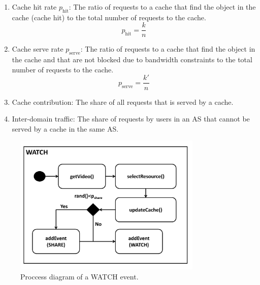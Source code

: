 \begin{enumerate}
\item Cache hit rate $p_\text{hit}$: The ratio of requests to a cache that find the object in the cache (cache hit) to the total number of requests to the cache.
\begin{equation}
  p_\text{hit}=\frac{k}{n}
\end{equation}
\item Cache serve rate $p_\text{serve}$: The ratio of requests to a cache that find the object in the cache and that are not blocked due to bandwidth constraints to the total number of requests to the cache.
\begin{equation}
  p_\text{serve}=\frac{k'}{n}
\end{equation}
\item Cache contribution: The share of all requests that is served by a cache.
\item Inter-domain traffic: The share of requests by users in an AS that cannot be served by a cache in the same AS.
\end{enumerate}

\begin{figure}[bt]
  \centering
  \includegraphics[width=0.8\textwidth]{hierarchical/simulative/figures/watch}
  \caption{Proccess diagram of a WATCH event.}
  \label{fig:WATCH}
\end{figure}

